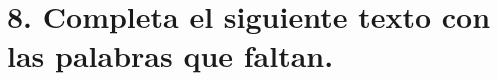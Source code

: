 
%
%
%



\section*{\textcolor{waveBlue2}{8. }Completa el siguiente texto con las palabras que faltan.}

